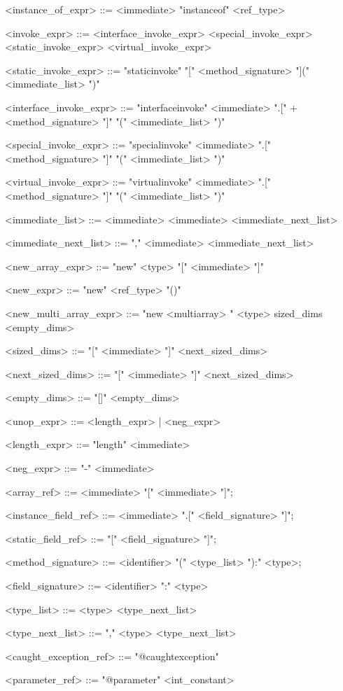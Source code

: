 \documentclass{report}
\begin{document}
\begin{grammar}
<instance_of_expr> ::= <immediate> "instanceof" <ref_type>

<invoke_expr> ::= <interface_invoke_expr> \alt <special_invoke_expr> \alt <static_invoke_expr> <virtual_invoke_expr>

<static_invoke_expr> ::= "staticinvoke" "[" <method_signature> "](" <immediate_list> ")"

<interface_invoke_expr> ::= "interfaceinvoke" <immediate> ".[" + <method_signature> "]" "(" <immediate_list> ")"

<special_invoke_expr> ::= "specialinvoke" <immediate> ".[" <method_signature> "]" "(" <immediate_list> ")"

<virtual_invoke_expr> ::= "virtualinvoke" <immediate> ".[" <method_signature> "]" "(" <immediate_list> ")"

<immediate_list> ::= <immediate> \alt <immediate> <immediate_next_list>

<immediate_next_list> ::= "," <immediate> <immediate_next_list>

<new_array_expr> ::= "new" <type> "[" <immediate> "]"

<new_expr> ::= "new" <ref_type> "()"

<new_multi_array_expr> ::= "new <multiarray> " <type> sized_dims <empty_dims>

<sized_dims> ::= "[" <immediate> "]" <next_sized_dims>

<next_sized_dims> ::= "[" <immediate> "]" <next_sized_dims>

<empty_dims> ::= "[]" <empty_dims> 

<unop_expr> ::= <length_expr> | <neg_expr>

<length_expr> ::= "length" <immediate>

<neg_expr> ::= "-" <immediate>

<array_ref> ::= <immediate> "[" <immediate> "]";

<instance_field_ref> ::= <immediate> ".[" <field_signature> "]";

<static_field_ref> ::= "[" <field_signature> "]";

<method_signature> ::= <identifier> "(" <type_list> "):" <type>;

<field_signature> ::= <identifier> ":" <type>

<type_list> ::= <type> <type_next_list>

<type_next_list> ::= "," <type> <type_next_list>

<caught_exception_ref> ::= "@caughtexception"

<parameter_ref> ::= "@parameter" <int_constant>


\end{grammar}
\end{document}
